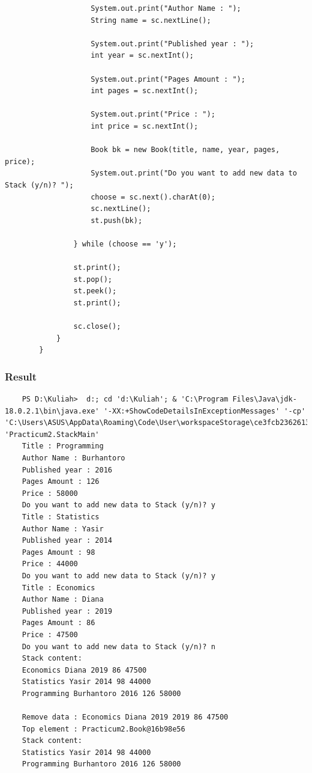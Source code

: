 \documentclass[12pt,titlepage]{article}
\begin{document}
\begin{enumerate}
\begin{verbatim}
                    System.out.print("Author Name : ");
                    String name = sc.nextLine();

                    System.out.print("Published year : ");
                    int year = sc.nextInt();

                    System.out.print("Pages Amount : ");
                    int pages = sc.nextInt();

                    System.out.print("Price : ");
                    int price = sc.nextInt();

                    Book bk = new Book(title, name, year, pages, price);
                    System.out.print("Do you want to add new data to Stack (y/n)? ");
                    choose = sc.next().charAt(0);
                    sc.nextLine();
                    st.push(bk);

                } while (choose == 'y');

                st.print();
                st.pop();
                st.peek();
                st.print();
                
                sc.close();
            }
        }
    \end{verbatim}
\end{enumerate}

\subsubsection{Result}

\begin{verbatim}
    PS D:\Kuliah>  d:; cd 'd:\Kuliah'; & 'C:\Program Files\Java\jdk-18.0.2.1\bin\java.exe' '-XX:+ShowCodeDetailsInExceptionMessages' '-cp' 'C:\Users\ASUS\AppData\Roaming\Code\User\workspaceStorage\ce3fcb236261368a6cbd019dc8ddda8b\redhat.java\jdt_ws\Kuliah_28156aa7\bin' 'Practicum2.StackMain' 
    Title : Programming
    Author Name : Burhantoro
    Published year : 2016
    Pages Amount : 126
    Price : 58000
    Do you want to add new data to Stack (y/n)? y
    Title : Statistics
    Author Name : Yasir
    Published year : 2014
    Pages Amount : 98
    Price : 44000
    Do you want to add new data to Stack (y/n)? y
    Title : Economics
    Author Name : Diana
    Published year : 2019
    Pages Amount : 86
    Price : 47500
    Do you want to add new data to Stack (y/n)? n
    Stack content: 
    Economics Diana 2019 86 47500
    Statistics Yasir 2014 98 44000
    Programming Burhantoro 2016 126 58000

    Remove data : Economics Diana 2019 2019 86 47500
    Top element : Practicum2.Book@16b98e56
    Stack content:
    Statistics Yasir 2014 98 44000
    Programming Burhantoro 2016 126 58000
\end{verbatim}
\end{document}
